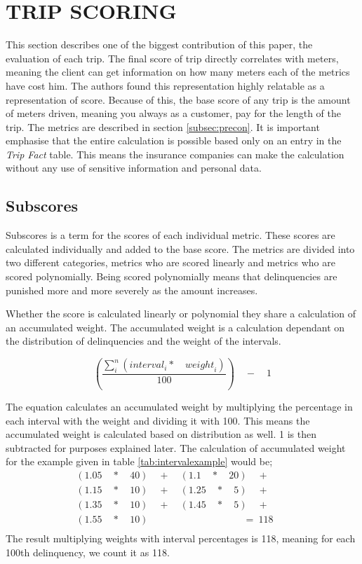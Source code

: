 \section{TRIP SCORING}\label{sec:trip}

This section describes one of the biggest contribution of this paper, the evaluation of each trip. The final score of trip directly correlates with meters, meaning the client can get information on how many meters each of the metrics have cost him. The authors found this representation highly relatable as a representation of score.
Because of this, the base score of any trip is the amount of meters driven, meaning you always as a customer, pay for the length of the trip. The metrics are described in section \ref{subsec:precon}.
It is important emphasise that the entire calculation is possible based only on an entry in the \textit{Trip Fact} table. This means the insurance companies can make the calculation without any use of sensitive information and personal data.

\subsection{Subscores} 

Subscores is a term for the scores of each individual metric. These scores are calculated individually and added to the base score. The metrics are divided into two different categories, metrics who are scored linearly and metrics who are scored polynomially. Being scored polynomially means that delinquencies are punished more and more severely as the amount increases.

Whether the score is calculated linearly or polynomial they share a calculation of an accumulated weight. The accumulated weight is a calculation dependant on the distribution of delinquencies and the weight of the intervals.

$$
\left( \frac { \sum _{ i }^{ n }{ \left( { interval }_{ i }*\quad { weight }_{ i } \right)  }  }{ 100 }  \right) \quad -\quad 1
$$

The equation calculates an accumulated weight by multiplying the percentage in each interval with the weight and dividing it with 100. This means the accumulated weight is calculated based on distribution as well. 1 is then subtracted for purposes explained later. The calculation of accumulated weight for the example given in table \ref{tab:intervalexample} would be;
\begin{align*}
(1.05\quad *\quad 40)\quad +\quad (1.1\quad *\quad 20)\quad +\quad \quad \\ 
  (1.15\quad *\quad 10)\quad +\quad (1.25\quad *\quad 5)\quad +\quad \quad \\
  (1.35\quad *\quad 10)\quad +\quad (1.45\quad *\quad 5)\quad +\quad \quad \\
  (1.55\quad *\quad 10)\quad \quad \quad \quad \quad \quad \quad \quad \ \ \ \quad =\ 118 \\
\end{align*}
The result multiplying weights with interval percentages is 118, meaning for each 100th delinquency, we count it as 118.

